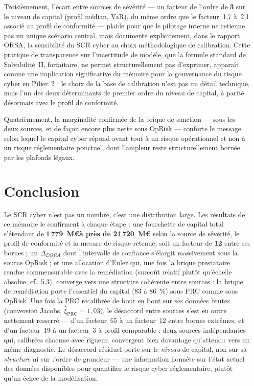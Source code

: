 \documentclass[11pt,a4paper]{article}
\theoremstyle{navystyle}
\theoremstyle{navydef}
\begin{document}
Troisièmement, l'écart entre sources de sévérité --- un facteur de l'ordre
de \textbf{3} sur le niveau de capital (profil médian, VaR), du même ordre
que le facteur~1{,}7 à~2{,}1 associé au profil de conformité --- plaide
pour que le pilotage interne ne retienne pas un unique scénario central, mais
documente explicitement, dans le rapport ORSA, la sensibilité du SCR cyber
au choix méthodologique de calibration. Cette pratique de transparence sur
l'incertitude de modèle, que la formule standard de Solvabilité~II,
forfaitaire, ne permet structurellement pas d'exprimer, apparaît comme
une implication significative du mémoire pour la gouvernance
du risque cyber en Pilier~2 : le choix de la base de calibration n'est pas
un détail technique, mais l'un des deux déterminants de premier ordre du
niveau de capital, à parité désormais avec le profil de conformité.

Quatrièmement, la marginalité confirmée de la brique de sanction --- sous
les deux sources, et de façon encore plus nette sous OpRisk --- conforte le
message selon lequel le capital cyber répond avant tout à un risque
opérationnel et non à un risque réglementaire ponctuel, dont l'ampleur reste
structurellement bornée par les plafonds légaux.

\section*{Conclusion}

Le SCR cyber n'est pas un nombre, c'est une distribution large. Les
résultats de ce mémoire le confirment à chaque étape : une fourchette de
capital total s'étendant de \textbf{1\,779~M\euro à près de 21\,720~M\euro} selon la
source de sévérité, le profil de conformité et la mesure de risque retenue,
soit un facteur de \textbf{12} entre ses bornes ; un $\Delta_{DORA}$ dont
l'intervalle de confiance s'élargit massivement sous la source
OpRisk ; et une allocation d'Euler qui, une fois la brique prestataire
rendue commensurable avec la remédiation (surcoût relatif plutôt qu'échelle
absolue, cf.~5.3), converge vers une structure cohérente entre sources : la
brique de remédiation porte l'essentiel du capital (83 à 86~\%) sous PRC
comme sous OpRisk. Une fois la PRC recalibrée de bout en bout sur ses
données brutes (conversion Jacobs, $\hat\xi_{\text{PRC}} = 1{,}03$), le
désaccord entre sources s'est en outre nettement resserré --- d'un facteur~65
à un facteur~12 entre bornes extrêmes, et d'un facteur~19 à un facteur~3 à
profil comparable : deux sources indépendantes qui, calibrées chacune avec
rigueur, convergent bien davantage qu'attendu vers un même diagnostic. Le
désaccord résiduel porte sur le \emph{niveau} de capital, non sur sa
\emph{structure} ni sur l'ordre de grandeur --- une information honnête sur
l'état actuel des données disponibles pour quantifier le risque cyber
réglementaire, plutôt qu'un échec de la modélisation.
\end{document}
